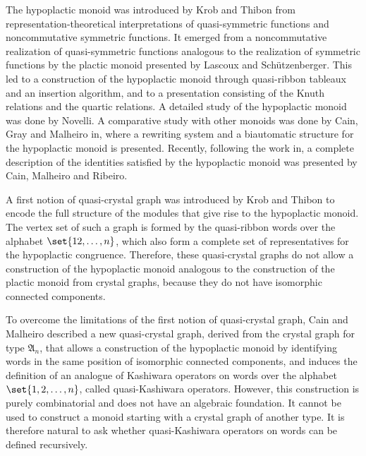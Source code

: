 \documentclass[a4paper,reqno]{amsart}
\numberwithin{equation}{section}
\theoremstyle{plain}
\theoremstyle{definition}
\theoremstyle{remark}
\newcommand*{\avoidcitebreak}{\nolinebreak[3] }  %
\newcommand*{\tA}{\mathfrak{A}}
\newcommand*{\tAn}{\tA_{n}}
\begin{document}
The hypoplactic monoid was introduced by Krob and Thibon\avoidcitebreak \cite{KT97} from representation-theoretical interpretations of quasi-symmetric functions and noncommutative symmetric functions.
It emerged from a noncommutative realization of quasi-symmetric functions analogous to the realization of symmetric functions by the plactic monoid presented by Lascoux and Sch\"{u}tzenberger\avoidcitebreak \cite{LS81}.
This led to a construction of the hypoplactic monoid through quasi-ribbon tableaux and an insertion algorithm, and to a presentation consisting of the Knuth relations and the quartic relations.
A detailed study of the hypoplactic monoid was done by Novelli\avoidcitebreak \cite{Nov00}.
A comparative study with other monoids was done by Cain, Gray and Malheiro in\avoidcitebreak \cite{CGM15r}, where a rewriting system and a biautomatic structure for the hypoplactic monoid is presented.
Recently, following the work in\avoidcitebreak \cite{Rib22}, a complete description of the identities satisfied by the hypoplactic monoid was presented by Cain, Malheiro and Ribeiro\avoidcitebreak \cite{CMR22}.

A first notion of quasi-crystal graph was introduced by Krob and Thibon\avoidcitebreak \cite{KT99} to encode the full structure of the modules that give rise to the hypoplactic monoid.
The vertex set of such a graph is formed by the quasi-ribbon words over the alphabet $\set{12,\ldots,n}$, which also form a complete set of representatives for the hypoplactic congruence.
Therefore, these quasi-crystal graphs do not allow a construction of the hypoplactic monoid analogous to the construction of the plactic monoid from crystal graphs, because they do not have isomorphic connected components.

To overcome the limitations of the first notion of quasi-crystal graph,
Cain and Malheiro\avoidcitebreak \cite{CM17crysthypo} described a new quasi-crystal graph, derived from the crystal graph for type $\tAn$, that allows a construction of the hypoplactic monoid by identifying words in the same position of isomorphic connected components,
and induces the definition of an analogue of Kashiwara operators on words over the alphabet $\set{1,2,\ldots,n}$, called quasi-Kashiwara operators.
However, this construction is purely combinatorial and does not have an algebraic foundation.
It cannot be used to construct a monoid starting with a crystal graph of another type\avoidcitebreak \cite[Remark~6.17]{Gui22}.
It is therefore natural to ask whether quasi-Kashiwara operators on words can be defined recursively.
\end{document}
